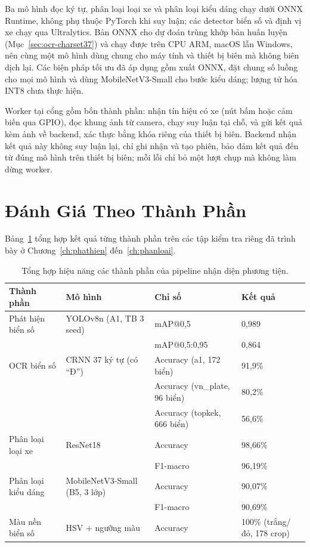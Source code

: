 Ba mô hình đọc ký tự, phân loại loại xe và phân loại kiểu dáng chạy dưới ONNX Runtime, không
phụ thuộc PyTorch khi suy luận; các detector biển số và định vị xe chạy qua Ultralytics. Bản
ONNX cho dự đoán trùng khớp bản huấn luyện (Mục~\ref{sec:ocr-charset37}) và chạy được trên CPU
ARM, macOS lẫn Windows, nên cùng một mô hình dùng chung cho máy tính và thiết bị biên mà không
biên dịch lại. Các biện pháp tối ưu đã áp dụng gồm xuất ONNX, đặt chung số luồng cho mọi mô
hình và dùng MobileNetV3-Small cho bước kiểu dáng; lượng tử hóa INT8 chưa thực hiện.

Worker tại cổng gồm bốn thành phần: nhận tín hiệu có xe (nút bấm hoặc cảm biến qua GPIO), đọc
khung ảnh từ camera, chạy suy luận tại chỗ, và gửi kết quả kèm ảnh về backend, xác thực bằng
khóa riêng của thiết bị biên. Backend nhận kết quả này không suy luận lại, chỉ ghi nhận và
tạo phiên, bảo đảm kết quả đến từ đúng mô hình trên thiết bị biên; mỗi lỗi chỉ bỏ một lượt
chụp mà không làm dừng worker.

\section{Đánh Giá Theo Thành Phần}
\label{sec:trienkhai-thanhphan}

Bảng~\ref{tab:eval-components} tổng hợp kết quả từng thành phần trên các tập kiểm tra riêng
đã trình bày ở Chương~\ref{ch:phathien} đến~\ref{ch:phanloai}.

\begin{table}[htbp]
\centering
\caption{Tổng hợp hiệu năng các thành phần của pipeline nhận diện phương tiện.}

\label{tab:eval-components}
\begin{tabular}{llll}
\toprule
\textbf{Thành phần} & \textbf{Mô hình} & \textbf{Chỉ số} & \textbf{Kết quả} \\
\midrule
Phát hiện biển số & YOLOv8n (A1, TB 3 seed)
  & mAP@0,5        & 0,989 \\
  & & mAP@0,5:0,95   & 0,864 \\
\midrule
OCR biển số & CRNN 37 ký tự (có ``Đ'')
  & Accuracy (a1, 172 biển)      & 91,9\% \\
  & & Accuracy (vn\_plate, 96 biển) & 80,2\% \\
  & & Accuracy (topkek, 666 biển)  & 56,6\% \\
\midrule
Phân loại loại xe & ResNet18
  & Accuracy       & 98,66\% \\
  & & F1-macro       & 96,19\% \\
\midrule
Phân loại kiểu dáng & MobileNetV3-Small (B5, 3 lớp)
  & Accuracy       & 90,07\% \\
  & & F1-macro       & 90,69\% \\
\midrule
Màu nền biển số & HSV + ngưỡng màu
  & Accuracy       & 100\% (trắng/đỏ, 178 crop) \\
\bottomrule
\end{tabular}
\end{table}

